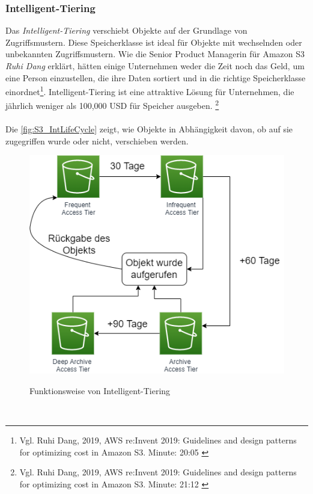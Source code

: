 \subsubsection{Intelligent-Tiering}
Das \textit{Intelligent-Tiering} verschiebt Objekte auf der Grundlage von Zugriffsmustern. Diese Speicherklasse ist ideal für Objekte mit wechselnden oder unbekannten Zugriffsmustern. Wie die Senior Product Managerin für Amazon S3 \textit{Ruhi Dang} erklärt, hätten einige Unternehmen weder die Zeit noch das Geld, um eine Person einzustellen, die ihre Daten sortiert und in die richtige Speicherklasse einordnet\footnote{Vgl. Ruhi Dang, 2019, AWS re:Invent 2019: Guidelines and design patterns for optimizing cost in Amazon S3. Minute: 20:05 \cite{AMZ16}}. Intelligent-Tiering ist eine attraktive Lösung für Unternehmen, die jährlich weniger als 100,000 USD für Speicher ausgeben. \footnote{Vgl. Ruhi Dang, 2019, AWS re:Invent 2019: Guidelines and design patterns for optimizing cost in Amazon S3. Minute: 21:12 \cite{AMZ16}}
\\\\
Die \autoref{fig:S3_IntLifeCycle} zeigt, wie Objekte in Abhängigkeit davon, ob auf sie zugegriffen wurde oder nicht, verschieben werden. 
\begin{figure}[h!]
  \centering
  \includegraphics[scale=0.6]{sources/S3_IntLifeCycle}
  \caption[Funktionsweise von Intelligent-Tiering]{}\label{fig:S3_IntLifeCycle} Funktionsweise von Intelligent-Tiering
\end{figure}\\
